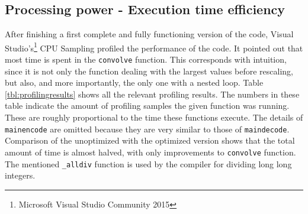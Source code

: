 \documentclass[a4paper]{article}
\begin{document}
\subsection{Processing power - Execution time efficiency}\label{sec:processing} 
After finishing a first complete and fully functioning version of the code, Visual Studio's\footnote{Microsoft Visual Studio Community 2015} CPU Sampling profiled the performance of the code. It pointed out that most time is spent in the \texttt{convolve} function. This corresponds with intuition, since it is not only the function dealing with the largest values before rescaling, but also, and more importantly, the only one with a nested loop. Table \ref{tbl:profilingresults} shows all the relevant profiling results. The numbers in these table indicate the amount of profiling samples the given function was running. These are roughly proportional to the time these functions execute. The details of \texttt{mainencode} are omitted because they are very similar to those of \texttt{maindecode}. Comparison of the unoptimized with the optimized version shows that the total amount of time is almost halved, with only improvements to \texttt{convolve} function. The mentioned \texttt{\_alldiv} function is used by the compiler for dividing long long integers.\\
\end{document}
